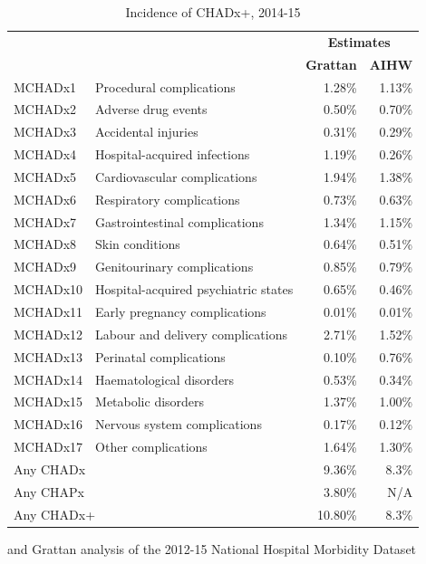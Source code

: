 \documentclass[submission]{grattan}
\begin{document}
\begin{table}
\caption{Incidence of CHADx+, 2014-15}\label{tbl:incidence-chadx-2014-15-Grattan-vs-AIHW}
\begin{tabularx}{\linewidth}{lXrr}
\toprule
& & \multicolumn{2}{c}{\textbf{Estimates}} \\
\cmidrule(lr){3-4}
& & \textbf{Grattan} & \textbf{AIHW}\tabularnewline
\midrule
MCHADx1& Procedural complications & 1.28\% & 1.13\%\tabularnewline
MCHADx2& Adverse drug events & 0.50\% & 0.70\%\tabularnewline
MCHADx3& Accidental injuries & 0.31\% & 0.29\%\tabularnewline
MCHADx4& Hospital-acquired infections & 1.19\% & 0.26\%\tabularnewline
MCHADx5& Cardiovascular complications & 1.94\% & 1.38\%\tabularnewline
MCHADx6& Respiratory complications & 0.73\% & 0.63\%\tabularnewline
MCHADx7& Gastrointestinal complications & 1.34\% & 1.15\%\tabularnewline
MCHADx8& Skin conditions & 0.64\% & 0.51\%\tabularnewline
MCHADx9& Genitourinary complications & 0.85\% & 0.79\%\tabularnewline
MCHADx10& Hospital-acquired psychiatric states & 0.65\% & 0.46\%\tabularnewline
MCHADx11& Early pregnancy complications & 0.01\% & 0.01\%\tabularnewline
MCHADx12& Labour and delivery complications & 2.71\% & 1.52\%\tabularnewline
MCHADx13& Perinatal complications & 0.10\% & 0.76\%\tabularnewline
MCHADx14& Haematological disorders & 0.53\% & 0.34\%\tabularnewline
MCHADx15& Metabolic disorders & 1.37\% & 1.00\%\tabularnewline
MCHADx16& Nervous system complications & 0.17\% & 0.12\%\tabularnewline
MCHADx17& Other complications & 1.64\% & 1.30\%\tabularnewline
\multicolumn{2}{l}{Any CHADx} & 9.36\% & 8.3\%\tabularnewline
\multicolumn{2}{l}{Any CHAPx} & 3.80\% & N/A\tabularnewline
\multicolumn{2}{l}{Any CHADx+} & 10.80\% & 8.3\%\tabularnewline
\bottomrule
\end{tabularx}
%
{\textcite{AIHW-hospital-2014-15} and Grattan analysis of the 2012-15 National Hospital Morbidity Dataset}
\end{table}
\end{document}
